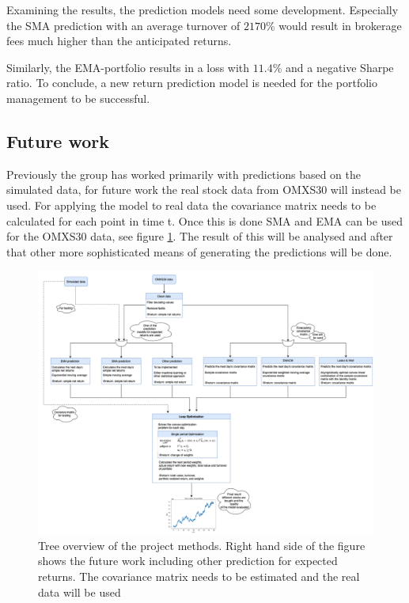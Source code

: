 \documentclass{LTHtwocol} %
\begin{document}
Examining the results, the prediction models need some development. Especially the SMA prediction with an average turnover of $2170$\% would result in brokerage fees much higher than the anticipated returns.

Similarly, the EMA-portfolio results in a loss with $11.4$\% and a negative Sharpe ratio. To conclude, a new return prediction model is needed for the portfolio management to be successful.

\subsection{Future work}
Previously the group has worked primarily with predictions based on the simulated data, for future work the real stock data from OMXS30 will instead be used. For applying the model to real data the covariance matrix needs to be calculated for each point in time t. Once this is done SMA and EMA can be used for the OMXS30 data, see figure \ref{fig:tree_future}. The result of this will be analysed and after that other more sophisticated means of generating the predictions will be done. 




\clearpage
\begin{figure}[t]
\centering
	\includegraphics[width=1\textwidth]{Pics/Mod_overview_future.png}
	\begin{centering}
	\caption{Tree overview of the project methods. Right hand side of the figure shows the future work including other prediction for expected returns. The covariance matrix needs to be estimated and the real data will be used}
	\end{centering}
	\label{fig:tree_future} %
\end{figure}


\printbibliography
\end{document}
